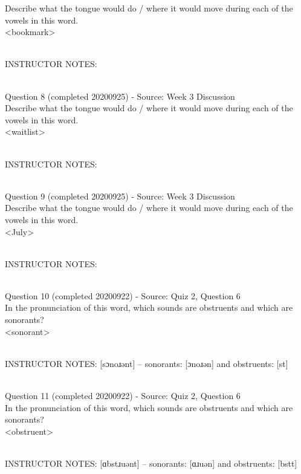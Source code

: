 \documentclass[12pt]{article}
\begin{document}
Describe what the tongue would do / where it would move during each of the vowels in this word.\\

<bookmark>


~\\
INSTRUCTOR NOTES: 


~\\

{\large Question 8} (completed 20200925) - Source: Week 3 Discussion\\

Describe what the tongue would do / where it would move during each of the vowels in this word.\\

<waitlist>


~\\
INSTRUCTOR NOTES: 


~\\

{\large Question 9} (completed 20200925) - Source: Week 3 Discussion\\

Describe what the tongue would do / where it would move during each of the vowels in this word.\\

<July>


~\\
INSTRUCTOR NOTES: 


~\\

{\large Question 10} (completed 20200922) - Source: Quiz 2, Question 6\\

In the pronunciation of this word, which sounds are obstruents and which are sonorants?\\

<sonorant>


~\\
INSTRUCTOR NOTES: [sɔnoɹənt] -- sonorants: [ɔnoɹən] and obstruents: [st]


~\\

{\large Question 11} (completed 20200922) - Source: Quiz 2, Question 6\\

In the pronunciation of this word, which sounds are obstruents and which are sonorants?\\

<obstruent>


~\\
INSTRUCTOR NOTES: [ɑbstɹuənt] -- sonorants: [ɑɹuən] and obstruents: [bstt]
\end{document}
